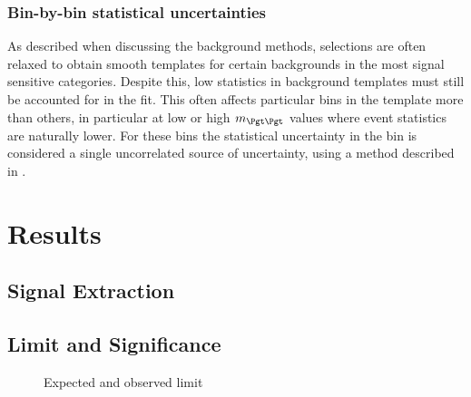 \subsubsection{\textbf{Bin-by-bin statistical uncertainties}}
As described when discussing the background methods, selections are often
relaxed to obtain smooth templates for certain backgrounds in the most signal
sensitive categories. Despite this, low statistics in background templates must
still be accounted for in the fit. This often affects particular bins in the
template more than others, in particular at low or high $m_{\Pgt\Pgt}$ values
where event statistics are naturally lower. For these bins the statistical
uncertainty in the bin is considered a single uncorrelated source of
uncertainty, using a method described in \cite{Barlow1993219}. 

\section{Results}
\label{sec:results}

\subsection{Signal Extraction}
\label{sec:signalextraction}

\subsection{Limit and Significance}
\label{sec:significance}

\begin{figure}[h!]
\caption{Expected and observed limit}
\label{fig:results-limit}
\end{figure}

